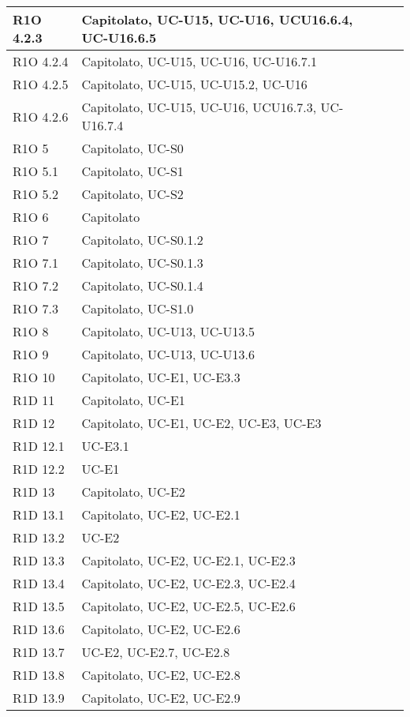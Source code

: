 \begin{center}
\begin{longtable}{ | l | p{2cm} | p{4.7cm} | p{2cm} |}
    R1O 4.2.3 & Capitolato, UC-U15, UC-U16, UCU16.6.4, UC-U16.6.5 \\ \hline
    R1O 4.2.4 & Capitolato, UC-U15, UC-U16, UC-U16.7.1 \\ \hline
    R1O 4.2.5 & Capitolato, UC-U15, UC-U15.2, UC-U16 \\ \hline
    R1O 4.2.6 & Capitolato, UC-U15, UC-U16, UCU16.7.3, UC-U16.7.4 \\ \hline
    R1O 5 & Capitolato, UC-S0 \\ \hline
    R1O 5.1 & Capitolato, UC-S1 \\ \hline
    R1O 5.2 & Capitolato, UC-S2 \\ \hline
    R1O 6 & Capitolato \\ \hline
    R1O 7 & Capitolato, UC-S0.1.2 \\ \hline
    R1O 7.1 & Capitolato, UC-S0.1.3 \\ \hline
    R1O 7.2 & Capitolato, UC-S0.1.4 \\ \hline
    R1O 7.3 & Capitolato, UC-S1.0 \\ \hline
    R1O 8 & Capitolato, UC-U13, UC-U13.5 \\ \hline
    R1O 9 & Capitolato, UC-U13, UC-U13.6 \\ \hline
    R1O 10 & Capitolato, UC-E1, UC-E3.3 \\ \hline
    R1D 11 & Capitolato, UC-E1 \\ \hline
    R1D 12 & Capitolato, UC-E1, UC-E2, UC-E3, UC-E3  \\ \hline
    R1D 12.1 & UC-E3.1  \\ \hline
    R1D 12.2 & UC-E1  \\ \hline
    R1D 13 & Capitolato, UC-E2 \\ \hline
    R1D 13.1 & Capitolato, UC-E2, UC-E2.1  \\ \hline
    R1D 13.2 & UC-E2 \\ \hline
    R1D 13.3 & Capitolato, UC-E2, UC-E2.1, UC-E2.3 \\ \hline
    R1D 13.4 & Capitolato, UC-E2, UC-E2.3, UC-E2.4  \\ \hline
    R1D 13.5 & Capitolato, UC-E2, UC-E2.5, UC-E2.6 \\ \hline
    R1D 13.6 & Capitolato, UC-E2, UC-E2.6 \\ \hline
    R1D 13.7 & UC-E2, UC-E2.7, UC-E2.8 \\ \hline
    R1D 13.8 & Capitolato, UC-E2, UC-E2.8 \\ \hline
    R1D 13.9 & Capitolato, UC-E2, UC-E2.9 \\ \hline

\end{longtable}
\end{center}
